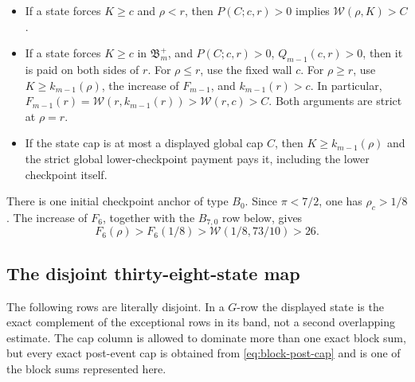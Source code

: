 \documentclass[11pt]{article}
\newcommand{\W}{\mathcal W}
\begin{document}
\begin{itemize}
\item[\(L\).] If a state forces \(K\geq c\) and \(\rho<r\), then
      \(P(C;c,r)>0\) implies \(\W(\rho,K)>C\).
\item[\(B\).] If a state forces \(K\geq c\) in \(\mathfrak B_m^+\),
      and \(P(C;c,r)>0\), \(Q_{m-1}(c,r)>0\), then it is paid on both
      sides of \(r\).  For \(\rho\leq r\), use the fixed wall \(c\).
      For \(\rho\geq r\), use \(K\geq k_{m-1}(\rho)\), the increase of
      \(F_{m-1}\), and \(k_{m-1}(r)>c\).  In particular,
      \(F_{m-1}(r)=\W(r,k_{m-1}(r))>\W(r,c)>C\).
      Both arguments are strict at
      \(\rho=r\).
\item[\(G\).] If the state cap is at most a displayed global cap \(C\),
      then \(K\geq k_{m-1}(\rho)\) and the strict global lower-checkpoint
      payment pays it, including the lower checkpoint itself.
\end{itemize}

There is one initial checkpoint anchor of type \(B_0\).  Since
\(\pi<7/2\), one has \(\rho_c>1/8\).  The increase of \(F_6\), together
with the \(B_{7,0}\) row below, gives
\[
 F_6(\rho)>F_6(1/8)>\W(1/8,73/10)>26.
\]

\subsection{The disjoint thirty-eight-state map}

The following rows are literally disjoint.  In a \(G\)-row the displayed
state is the exact complement of the exceptional rows in its band, not a
second overlapping estimate.  The cap column is allowed to dominate more
than one exact block sum, but every exact post-event cap is obtained from
\eqref{eq:block-post-cap} and is one of the block sums represented here.
\end{document}
